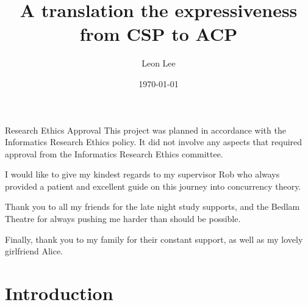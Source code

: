 \documentclass[logo,bsc,singlespacing,parskip,online]{infthesis}
\begin{document}
\begin{preliminary}

\title{A translation the expressiveness from CSP to ACP}

\author{Leon Lee}
\date{\today}


\maketitle

\newenvironment{ethics}
   {\begin{frontenv}{Research Ethics Approval}{\LARGE}}
   {\end{frontenv}\newpage}

\begin{ethics}
This project was planned in accordance with the Informatics Research
Ethics policy. It did not involve any aspects that required approval
from the Informatics Research Ethics committee.

\standarddeclaration
\end{ethics}


\begin{acknowledgements}
   I would like to give my kindest regards to my supervisor Rob who always provided a patient and excellent guide on this journey into concurrency theory.

   Thank you to all my friends for the late night study supports, and the Bedlam Theatre for always pushing me harder than should be possible.

   Finally, thank you to my family for their constant support, as well as my lovely girlfriend Alice.
\end{acknowledgements}

\end{preliminary}


\chapter{Introduction}

\end{document}
